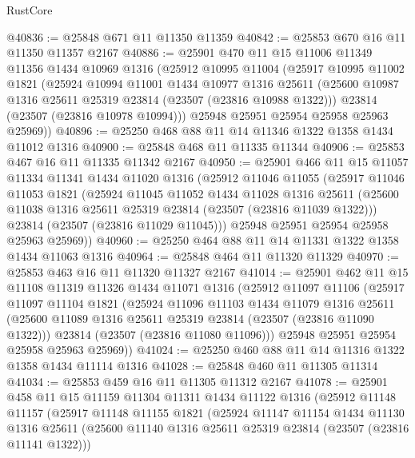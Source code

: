 \begin{lexlean}{RustCore}
\begin{coremodule}
@40836 := @25848 @671 @11 @11350 @11359
@40842 := @25853 @670 @16 @11 @11350 @11357 @2167
@40886 := @25901
    @470
    @11
    @15
    @11006
    @11349
    @11356
    @1434
    @10969
    @1316
    (@25912
      @10995
      @11004
      (@25917
        @10995
        @11002
        @1821
        (@25924
          @10994
          @11001
          @1434
          @10977
          @1316
          @25611
          (@25600 @10987 @1316 @25611 @25319 @23814 (@23507 (@23816 @10988 @1322)))
          @23814
          (@23507 (@23816 @10978 @10994)))
        @25948
        @25951
        @25954
        @25958
        @25963
        @25969))
@40896 := @25250 @468 @88 @11 @14 @11346 @1322 @1358 @1434 @11012 @1316
@40900 := @25848 @468 @11 @11335 @11344
@40906 := @25853 @467 @16 @11 @11335 @11342 @2167
@40950 := @25901
    @466
    @11
    @15
    @11057
    @11334
    @11341
    @1434
    @11020
    @1316
    (@25912
      @11046
      @11055
      (@25917
        @11046
        @11053
        @1821
        (@25924
          @11045
          @11052
          @1434
          @11028
          @1316
          @25611
          (@25600 @11038 @1316 @25611 @25319 @23814 (@23507 (@23816 @11039 @1322)))
          @23814
          (@23507 (@23816 @11029 @11045)))
        @25948
        @25951
        @25954
        @25958
        @25963
        @25969))
@40960 := @25250 @464 @88 @11 @14 @11331 @1322 @1358 @1434 @11063 @1316
@40964 := @25848 @464 @11 @11320 @11329
@40970 := @25853 @463 @16 @11 @11320 @11327 @2167
@41014 := @25901
    @462
    @11
    @15
    @11108
    @11319
    @11326
    @1434
    @11071
    @1316
    (@25912
      @11097
      @11106
      (@25917
        @11097
        @11104
        @1821
        (@25924
          @11096
          @11103
          @1434
          @11079
          @1316
          @25611
          (@25600 @11089 @1316 @25611 @25319 @23814 (@23507 (@23816 @11090 @1322)))
          @23814
          (@23507 (@23816 @11080 @11096)))
        @25948
        @25951
        @25954
        @25958
        @25963
        @25969))
@41024 := @25250 @460 @88 @11 @14 @11316 @1322 @1358 @1434 @11114 @1316
@41028 := @25848 @460 @11 @11305 @11314
@41034 := @25853 @459 @16 @11 @11305 @11312 @2167
@41078 := @25901
    @458
    @11
    @15
    @11159
    @11304
    @11311
    @1434
    @11122
    @1316
    (@25912
      @11148
      @11157
      (@25917
        @11148
        @11155
        @1821
        (@25924
          @11147
          @11154
          @1434
          @11130
          @1316
          @25611
          (@25600 @11140 @1316 @25611 @25319 @23814 (@23507 (@23816 @11141 @1322)))

\end{coremodule}
\end{lexlean}
